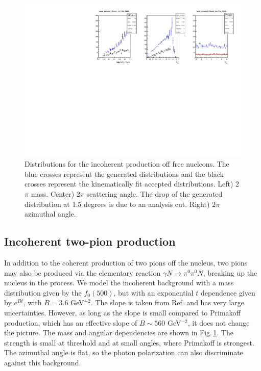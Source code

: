 \begin{figure}[tbp]
\begin{center}
\includegraphics[width=16cm,clip=true]{figures/twopi_primakoff_DSelect_test_File_20000_IC.pdf}
\caption{Distributions for the incoherent production off free nucleons. The blue crosses represent the generated distributions and the black crosses represent the kinematically fit accepted distributions.
Left) 2$\pi$ mass. Center) 2$\pi$ scattering angle. The drop of the generated distribution at 1.5 degrees is due to an analysis cut. Right) 2$\pi$ azimuthal angle.
\label{fig:IC}}
\end{center} 
\end{figure}

\subsection{Incoherent two-pion production}
In addition to the coherent production of two pions off the nucleus, two pions may also be produced via the elementary reaction $\gamma N\to \pi^0 \pi^0 N$, breaking up the nucleus in the process. We model the incoherent background with a mass distribution given by the $f_0(500)$, but with an exponential $t$ dependence given by $e^{Bt}$, with $B=3.6$ GeV$^{-2}$. The slope is taken from Ref.\cite{Battaglieri:2009aa} and has very large uncertainties. However, as long as the slope is small compared to Primakoff production, which has an effective slope of $B\sim560$ GeV$^{-2}$, it does not change the picture. The mass and angular dependencies are shown in Fig.\,\ref{fig:IC}. The strength is small at threshold and at small angles, where Primakoff is strongest. The azimuthal angle is flat, so the photon polarization can also discriminate against this background. 

